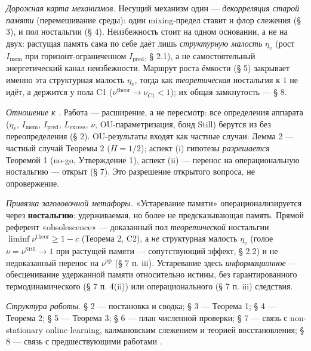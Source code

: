 \documentclass[12pt]{iopart}
\begin{document}
\emph{Дорожная карта механизмов.} Несущий механизм один --- \emph{декорреляция старой памяти} (перемешивание среды): один mixing-предел ставит и флор слежения (§ 3), и пол ностальгии (§ 4). Неизбежность стоит на одном основании, а не на двух: растущая память сама по себе даёт лишь \emph{структурную малость} \(\eta_v\) (рост \(I_{\text{mem}}\) при горизонт-ограниченном \(I_{\text{pred}}\), § 2.1), а не самостоятельный энергетический канал неизбежности. Маршрут роста ёмкости (§ 5) закрывает именно эта структурная малость \(\eta_v\), тогда как \emph{теоретическая} ностальгия к \(1\) не идёт, а держится у пола C1 (\(\nu^{\text{theor}} \to \nu_{C1} < 1\)); их общая замкнутость --- § 8.



\emph{Отношение к \cite{Andriishin2026b}.} Работа --- расширение, а не пересмотр: все определения аппарата (\(\eta_v\), \(I_{\text{mem}}\), \(I_{\text{pred}}\), \(L_{\text{excess}}\), \(\nu\), OU-параметризация, бонд Still) берутся из \cite{Andriishin2026b} без переопределения (§ 2). OU-результаты входят как частные случаи: Лемма 2 --- частный случай Теоремы 2 (\(H = 1/2\)); аспект (i) гипотезы \emph{разрешается} Теоремой 1 (no-go, Утверждение 1), аспект (ii) --- перенос на операциональную ностальгию --- открыт (§ 7). Это разрешение открытого вопроса, не опровержение.



\emph{Привязка заголовочной метафоры.} «Устаревание памяти» операционализируется через \textbf{ностальгию}: удерживаемая, но более не предсказывающая память. Прямой референт «obsolescence» --- доказанный пол \emph{теоретической} ностальгии \(\liminf\nu^{\text{theor}} \ge 1-c\) (Теорема 2, C2), а \emph{не} структурная малость \(\eta_v\) (голое \(\nu = \nu^{\text{Still}} \to 1\) при растущей памяти --- сопутствующий эффект, § 2.2) и не недоказанный перенос на \(\nu^{\text{op}}\) (§ 7 п. iii). Устаревание здесь \emph{информационное} --- обесценивание удержанной памяти относительно истины, без гарантированного термодинамического (§ 7 п. 4(ii)) или операционального (§ 7 п. iii) следствия.



\emph{Структура работы.} § 2 --- постановка и сводка; § 3 --- Теорема 1; § 4 --- Теорема 2; § 5 --- Теорема 3; § 6 --- план численной проверки; § 7 --- связь с non-stationary online learning, калмановским слежением и теорией восстановления; § 8 --- связь с предшествующими работами \cite{Andriishin2026a,Andriishin2026b}.
\end{document}
